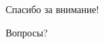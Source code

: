 \documentclass[russian, hyperref={unicode}]{beamer}
\begin{document}
\begin{frame}{Спасибо за внимание!}
    \begin{center}
        \Huge
        {\color{blue} Вопросы?}
    \end{center}
\end{frame}


\end{document}
